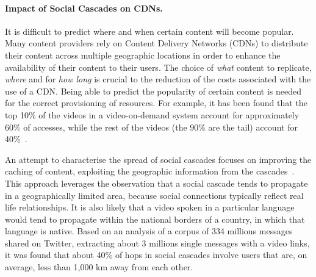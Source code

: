 \paragraph{Impact of Social Cascades on CDNs.}
It is difficult to predict where and when certain content will become popular.
Many content providers rely on Content Delivery Networks (CDNs) to distribute their content across
multiple geographic locations in order to enhance the availability of their content to their users. The
choice of \emph{what} content to replicate, \emph{where} and for \emph{how long} is crucial to the
reduction of the costs associated with the use of a CDN. Being able to predict the popularity of certain
content is needed for the correct provisioning of resources. For example, it has
been found that the top 10\% of the videos in a video-on-demand system account for approximately 60\% of
accesses, while the rest of the videos (\ie the 90\% are the tail) account for
40\%~\cite{buzztraq}.

An attempt to characterise the spread of social cascades focuses on improving the caching of
content, exploiting the geographic information from the cascades~\cite{socialcascades-salvo}.
This approach leverages the observation that a social cascade tends to propagate in a geographically
limited area, because social connections typically reflect real life relationships. It is
also likely that a video spoken in a particular language would tend to propagate within the national
borders of a country, in which that language is native. Based on an analysis of a corpus of 334 millions messages
shared on Twitter, extracting about 3 millions single messages with a video links, it was found that
about 40\% of hops in social cascades involve users that are, on average, less than 1,000 km away from
each other.

% 
